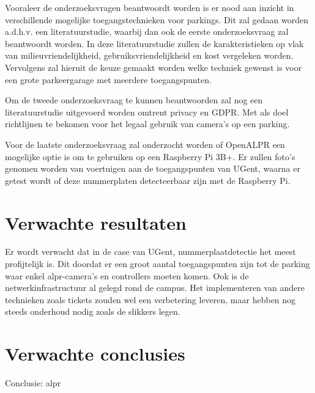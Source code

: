 Vooraleer de onderzoeksvragen beantwoordt worden is er nood aan inzicht in verschillende mogelijke toegangstechnieken voor parkings. Dit zal gedaan worden a.d.h.v. een literatuurstudie, waarbij dan ook de eerste onderzoeksvraag zal beantwoordt worden. In deze literatuurstudie zullen de karakteristieken op vlak van milieuvriendelijkheid, gebruiksvriendelijkheid en kost vergeleken worden. Vervolgens zal hieruit de keuze gemaakt worden welke techniek gewenst is voor een grote parkeergarage met meerdere toegangspunten.

Om de tweede onderzoeksvraag te kunnen beantwoorden zal nog een literatuurstudie uitgevoerd worden omtrent privacy en GDPR. Met als doel richtlijnen te bekomen voor het legaal gebruik van camera's op een parking.

Voor de laatste onderzoeksvraag zal onderzocht worden of OpenALPR een mogelijke optie is om te gebruiken op een Raspberry Pi 3B+. Er zullen foto's genomen worden van voertuigen aan de toegangspunten van UGent, waarna er getest wordt of deze nummerplaten detecteerbaar zijn met de Raspberry Pi.

\section{Verwachte resultaten}
\label{sec:verwachte_resultaten}
Er wordt verwacht dat in de case van UGent, nummerplaatdetectie het meest profijtelijk is. Dit doordat er een groot aantal toegangspunten zijn tot de parking waar enkel alpr-camera's en controllers moeten komen. Ook is de netwerkinfrastructuur al gelegd rond de campus. Het implementeren van andere technieken zoals tickets zouden wel een verbetering leveren, maar hebben nog steeds onderhoud nodig zoals de slikkers legen.

\section{Verwachte conclusies}
\label{sec:verwachte_conclusies}


Conclusie: alpr